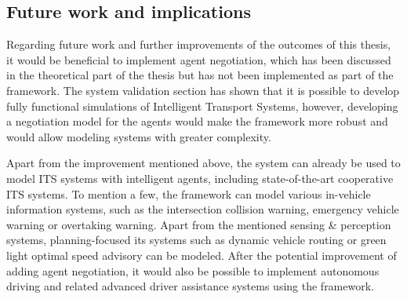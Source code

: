 \documentclass[0main.tex]{subfiles}
\begin{document}
\subsection{Future work and implications}

Regarding future work and further improvements of the outcomes of this thesis, it would be
beneficial to implement agent negotiation, which has been discussed in the theoretical part of
the thesis but has not been implemented as part of the framework. The system validation section
has shown that it is possible to develop fully functional simulations of Intelligent Transport
Systems, however, developing a negotiation model for the agents would make the framework more
robust and would allow modeling systems with greater complexity.

Apart from the improvement mentioned above, the system can already be used to model ITS systems
with intelligent agents, including state-of-the-art cooperative ITS systems. To mention a few,
the framework can model various in-vehicle information systems, such as the intersection
collision warning, emergency vehicle warning or overtaking warning. Apart from the mentioned
sensing \& perception systems, planning-focused its systems such as dynamic vehicle routing or
green light optimal speed advisory can be modeled. After the potential improvement of adding
agent negotiation, it would also be possible to implement autonomous driving and related
advanced driver assistance systems using the framework.
\end{document}

